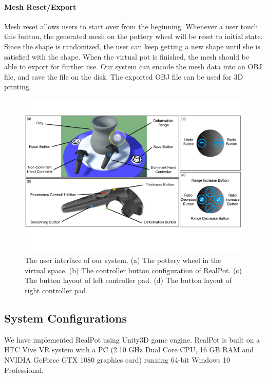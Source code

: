 \documentclass{svjour3}                     %
\begin{document}
\paragraph{Mesh Reset/Export}
Mesh reset allows users to start over from the beginning.
Whenever a user touch this button, the generated mesh on the pottery wheel will be reset to initial state. Since the shape is randomized, the user can keep getting a new shape until she is satisfied with the shape.
When the virtual pot is finished, the mesh should be able to export for further use. Our system can encode the mesh data into an OBJ file, and save the file on the disk. The exported OBJ file can be used for 3D printing.


\begin{figure}
\includegraphics[width=\textwidth]{fig9}
\caption{The user interface of our system. (a) The pottery wheel in the virtual space. (b) The controller button configuration of RealPot. (c) The button layout of left controller pad. (d) The button layout of right controller pad.}
\label{fig:ui}
\end{figure}


\subsection{System Configurations}
\label{sec:config}

We have implemented RealPot using Unity3D \cite{website:unity} game engine. RealPot is built on a HTC Vive VR system with a PC (2.10 GHz Dual Core CPU, 16 GB RAM and NVIDIA GeForce GTX 1080 graphics card) running 64-bit Windows 10 Professional.
\end{document}
